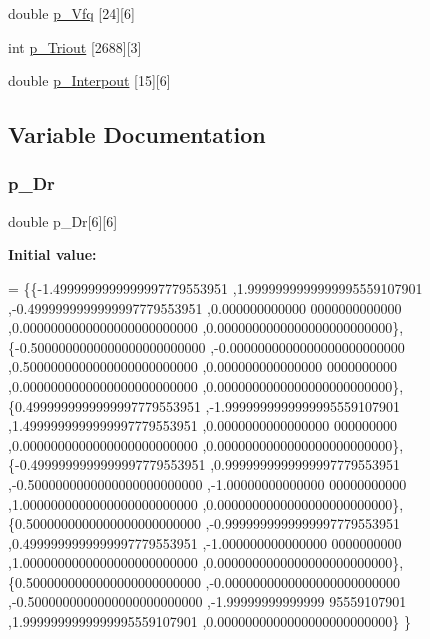 \begin{DoxyCompactItemize}
\item 
double \hyperlink{a00449_a00c3283795a9d9a77122c4fe663af0f9}{p\+\_\+\+Vfq} \mbox{[}24\mbox{]}\mbox{[}6\mbox{]}
\item 
int \hyperlink{a00449_a18cfd6f50be18d3cfbb0235076b8d729}{p\+\_\+\+Triout} \mbox{[}2688\mbox{]}\mbox{[}3\mbox{]}
\item 
double \hyperlink{a00449_a5a4fc60c61f9d01866e9ae4823a91ebe}{p\+\_\+\+Interpout} \mbox{[}15\mbox{]}\mbox{[}6\mbox{]}
\end{DoxyCompactItemize}


\subsection{Variable Documentation}
\mbox{\label{a00449_ae285bac3d0e41f5e7cf51bbd552fd453}} 
\subsubsection{\texorpdfstring{p\+\_\+\+Dr}{p\_Dr}}
{\footnotesize\ttfamily double p\+\_\+\+Dr\mbox{[}6\mbox{]}\mbox{[}6\mbox{]}}

{\bfseries Initial value\+:}
\begin{DoxyCode}
= \{\{-1.4999999999999997779553951 ,1.9999999999999995559107901 ,-0.4999999999999997779553951 ,0.000000000000
      0000000000000 ,0.0000000000000000000000000 ,0.0000000000000000000000000\},
\{-0.5000000000000000000000000 ,-0.0000000000000000000000000 ,0.5000000000000000000000000 ,0.000000000000000
      0000000000 ,0.0000000000000000000000000 ,0.0000000000000000000000000\},
\{0.4999999999999997779553951 ,-1.9999999999999995559107901 ,1.4999999999999997779553951 ,0.0000000000000000
      000000000 ,0.0000000000000000000000000 ,0.0000000000000000000000000\},
\{-0.4999999999999997779553951 ,0.9999999999999997779553951 ,-0.5000000000000000000000000 ,-1.00000000000000
      00000000000 ,1.0000000000000000000000000 ,0.0000000000000000000000000\},
\{0.5000000000000000000000000 ,-0.9999999999999997779553951 ,0.4999999999999997779553951 ,-1.000000000000000
      0000000000 ,1.0000000000000000000000000 ,0.0000000000000000000000000\},
\{0.5000000000000000000000000 ,-0.0000000000000000000000000 ,-0.5000000000000000000000000 ,-1.99999999999999
      95559107901 ,1.9999999999999995559107901 ,0.0000000000000000000000000\}
\}
\end{DoxyCode}
\mbox{\label{a00449_a7a727ec3e6bbdc14813685b5237491ab}} 
